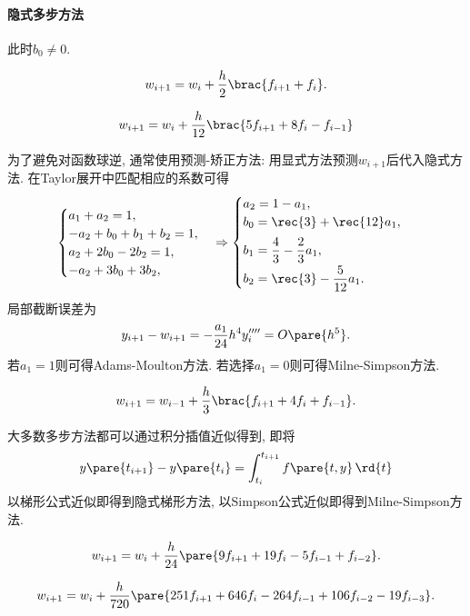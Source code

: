 \documentclass{ctexart}
\begin{document}
\paragraph{隐式多步方法} %
\label{par:隐式多步方法}

此时$b_0 \neq 0$.
\begin{theorem}[隐式梯形方法(二阶)]
    \[ w_{i+1} = w_i + \frac{h}{2}\brac{f_{i+1} + f_i}. \]
\end{theorem}
\begin{theorem}
    \[ w_{i+1} = w_i + \frac{h}{12}\brac{5f_{i+1} +8f_i - f_{i-1}} \]    
\end{theorem}
为了避免对函数球逆, 通常使用预测-矫正方法: 用显式方法预测$w_{i+1}$后代入隐式方法. 在Taylor展开中匹配相应的系数可得
\[ \begin{cases}
    a_1 + a_2 = 1,\\
    -a_2 + b_0 + b_1 + b_2 = 1, \\
    a_2 + 2b_0 - 2b_2 = 1, \\
    -a_2 + 3b_0 + 3b_2,
\end{cases} \Rightarrow \begin{cases}
    \displaystyle a_2 = 1 - a_1, \\
    \displaystyle b_0 = \rec{3} + \rec{12}a_1, \\[.5em]
    \displaystyle b_1 = \frac{4}{3} - \frac{2}{3}a_1, \\[.5em]
    \displaystyle b_2 = \rec{3} - \frac{5}{12}a_1.
\end{cases} \]
局部截断误差为
\[ y_{i+1} - w_{i+1} = -\frac{a_1}{24}h^4y''''_i = O\pare{h^5}. \]
若$a_1 = 1$则可得Adams-Moulton方法. 若选择$a_1 = 0$则可得Milne-Simpson方法.
\begin{theorem}
    \[ w_{i+1} = w_{i-1} + \frac{h}{3}\brac{f_{i+1} + 4f_i + f_{i-1}}. \]
\end{theorem}
大多数多步方法都可以通过积分插值近似得到, 即将
\[ y\pare{t_{i+1}} - y\pare{t_i} = \int_{t_i}^{t_{i+1}} f\pare{t,y}\,\rd{t} \]
以梯形公式近似即得到隐式梯形方法, 以Simpson公式近似即得到Milne-Simpson方法.
\begin{theorem}
    \[ w_{i+1} = w_i + \frac{h}{24}\pare{9f_{i+1} + 19f_i - 5f_{i-1} + f_{i-2}}. \]
\end{theorem}
\begin{theorem}
    \[ w_{i+1} = w_i + \frac{h}{720}\pare{251f_{i+1} + 646f_i - 264f_{i-1} + 106f_{i-2} - 19f_{i-3}}. \]
\end{theorem}
\end{document}
